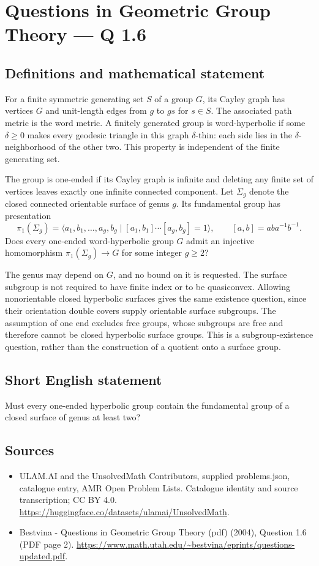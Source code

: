 \documentclass[11pt,a4paper]{article}
\begin{document}
\section*{Questions in Geometric Group Theory — Q 1.6}\label{statement}

\subsection{Definitions and mathematical statement}
For a finite symmetric generating set $S$ of a group $G$, its Cayley graph has vertices $G$ and unit-length edges from $g$ to $gs$ for $s\in S$. The associated path metric is the word metric. A finitely generated group is word-hyperbolic if some $\delta\geq0$ makes every geodesic triangle in this graph $\delta$-thin: each side lies in the $\delta$-neighborhood of the other two. This property is independent of the finite generating set.

The group is one-ended if its Cayley graph is infinite and deleting any finite set of vertices leaves exactly one infinite connected component. Let $\Sigma_g$ denote the closed connected orientable surface of genus $g$. Its fundamental group has presentation
\[
 \pi_1(\Sigma_g)=\langle a_1,b_1,\ldots,a_g,b_g\mid
                  [a_1,b_1]\cdots[a_g,b_g]=1\rangle,
 \qquad [a,b]=aba^{-1}b^{-1}.
\]
Does every one-ended word-hyperbolic group $G$ admit an injective homomorphism $\pi_1(\Sigma_g)\to G$ for some integer $g\geq2$?

The genus may depend on $G$, and no bound on it is requested. The surface subgroup is not required to have finite index or to be quasiconvex. Allowing nonorientable closed hyperbolic surfaces gives the same existence question, since their orientation double covers supply orientable surface subgroups. The assumption of one end excludes free groups, whose subgroups are free and therefore cannot be closed hyperbolic surface groups. This is a subgroup-existence question, rather than the construction of a quotient onto a surface group.
\subsection{Short English statement}
Must every one-ended hyperbolic group contain the fundamental group of a closed surface of genus at least two?
\subsection{Sources}
\begin{itemize}
\item[S1] ULAM.AI and the UnsolvedMath Contributors, supplied problems.json, catalogue entry, AMR Open Problem Lists. Catalogue identity and source transcription; CC BY 4.0.
\url{https://huggingface.co/datasets/ulamai/UnsolvedMath}.
\item[S2] Bestvina - Questions in Geometric Group Theory (pdf) (2004), Question 1.6 (PDF page 2). 
\url{https://www.math.utah.edu/~bestvina/eprints/questions-updated.pdf}.
\end{itemize}
\end{document}
